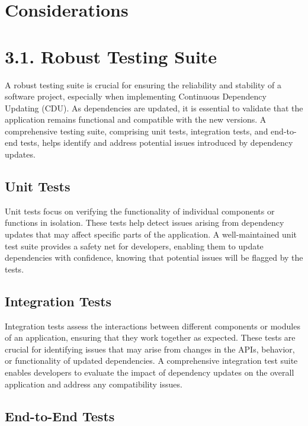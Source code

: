 \documentclass[10pt]{article}
\begin{document}
\section*{Considerations}

\section*{3.1. Robust Testing Suite}

A robust testing suite is crucial for ensuring the reliability and stability of a software project, especially when implementing Continuous Dependency Updating (CDU). As dependencies are updated, it is essential to validate that the application remains functional and compatible with the new versions. A comprehensive testing suite, comprising unit tests, integration tests, and end-to-end tests, helps identify and address potential issues introduced by dependency updates.

\subsection*{Unit Tests}

Unit tests focus on verifying the functionality of individual components or functions in isolation. These tests help detect issues arising from dependency updates that may affect specific parts of the application. A well-maintained unit test suite provides a safety net for developers, enabling them to update dependencies with confidence, knowing that potential issues will be flagged by the tests.

\subsection*{Integration Tests}

Integration tests assess the interactions between different components or modules of an application, ensuring that they work together as expected. These tests are crucial for identifying issues that may arise from changes in the APIs, behavior, or functionality of updated dependencies. A comprehensive integration test suite enables developers to evaluate the impact of dependency updates on the overall application and address any compatibility issues.

\subsection*{End-to-End Tests}
\end{document}
